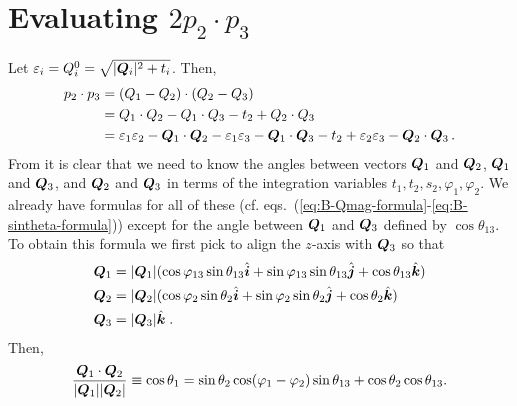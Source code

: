 \newcommand*{\sintheta}[2]{
    \sqrt{\frac{4 m_a^2 (-G_{#1})}{\lambda_{#1} \lambda_{#2}}}
}
\newcommand*{\costheta}[2]{
    \frac{\sqrt{\Lambda_{#1} \Lambda_{#2}} - 2 m_a^2 (t_{#1} + t_{#2} - m_{#2}^2)}{\sqrt{\lambda_{#1}\lambda_{#2}}}
}

\section{Evaluating $2 p_2 \cdot p_3$}
\label{app:2-dot-3}

Let $\varepsilon_i = Q_i^0 = \sqrt{|\bm{Q}_{i}|^2 + t_i}$. Then,
\begin{equation}
    \label{eq:p2_dot_p3-Minkowski-dot-product}
    \begin{aligned}
        p_2 \cdot p_3 
        &=
            (Q_1 - Q_2)\cdot(Q_2 - Q_3)     \\
        &=
            Q_1 \cdot Q_2 - Q_1 \cdot Q_3 - t_2 + Q_2 \cdot Q_3 \\
        &= 
            \varepsilon_1 \varepsilon_2 - \bm{Q}_{1}\cdot\bm{Q}_{2}
        -
            \varepsilon_1 \varepsilon_3 - \bm{Q}_{1}\cdot\bm{Q}_{3}
        -
            t_2
        +
        \varepsilon_2 \varepsilon_3 - \bm{Q}_{2}\cdot\bm{Q}_{3} \, . 
    \end{aligned}
\end{equation}
From  it is clear that we need to know the angles between vectors $\bm{Q}_{1}$ and $\bm{Q}_{2}$, $\bm{Q}_{1}$ and $\bm{Q}_{3}$, and $\bm{Q}_{2}$ and $\bm{Q}_{3}$ in terms of the integration variables $t_1, t_2, s_2, \varphi_1, \varphi_2$. 
We already have formulas for all of these (cf. eqs.~(\ref{eq:B-Qmag-formula}-\ref{eq:B-sintheta-formula})) except for the angle between $\bm{Q}_{1}$ and $\bm{Q}_{3}$ defined by $\cos\theta_{13}$. 
To obtain this formula we first pick to align the $z$-axis with $\bm{Q}_{3}$ so that
\begin{align}
    \bm{Q}_{1} &= |\bm{Q}_{1}| (\cos \varphi_{13} \sin \theta_{13} \hat{\bm{i}} + \sin \varphi_{13} \sin \theta_{13} \hat{\bm{j}} + \cos \theta_{13} \hat{\bm{k}}) \\
    \bm{Q}_{2} &= |\bm{Q}_{2}| (\cos \varphi_2 \sin \theta_2 \hat{\bm{i}} + \sin \varphi_2 \sin \theta_2 \hat{\bm{j}} + \cos \theta_2 \hat{\bm{k}}) \\
    \bm{Q}_{3} &= |\bm{Q}_{3}| \hat{\bm{k}} \; .
\end{align}
Then, 
\begin{equation}
    \frac{\bm{Q}_{1}\cdot\bm{Q}_{2} }{|\bm{Q}_{1}||\bm{Q}_{2}|}\equiv \cos \theta_1 = \sin \theta_2  \cos(\varphi_1 - \varphi_2) \sin \theta_{13} + \cos\theta_2 \cos\theta_{13} .
\end{equation}
